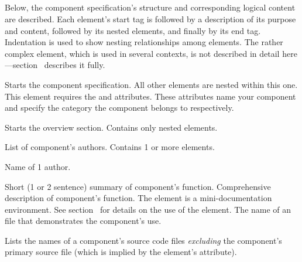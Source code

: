 \documentclass[11pt]{article}
\begin{document}
\subsection{\SUBSECstructContent}
\label{\SUBSECstructContent}

Below, the component specification's \xml{} structure and corresponding
logical content are described.  Each element's start tag is followed by a
description of its purpose and content, followed by its nested elements,
and finally by its end tag.  Indentation is used to show nesting
relationships among elements.  The rather complex 
element, which is used in several contexts, is not described in detail
here---section~\sechyperref{\SUBSECdescElement} describes it fully.

\begin{description}
   Starts the component specification.  All
  other elements are nested within this one.  This element requires the
   and  attributes.  These
  attributes name your component and specify
  the category the component belongs to respectively.
  \begin{description}
     Starts the overview section.  Contains only
    nested elements.
    \begin{description}
        List of component's authors.  Contains 1 or more
       elements.
      \begin{description}
         Name of 1 author.
      \end{description}
       Short (1 or 2 sentence) summary of component's
      function. 
       Comprehensive description of component's
      function.  The  element is a mini-documentation
      environment.  See
      section~\sechyperref{\SUBSECdescElement}
      for details on the use of the  element.
       The name of an  file that
      demonstrates the component's use.
    \end{description}
     Lists the names of
    a component's source code files \emph{excluding} the component's
    primary source file (which is implied by the 
    element's  attribute).
    

\end{description}
\end{description}
\end{document}
